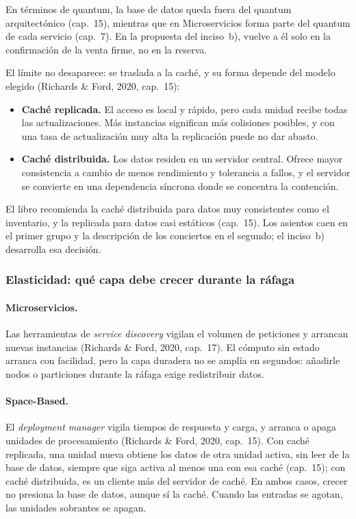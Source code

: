 En términos de quantum, la base de datos queda fuera del quantum arquitectónico
(cap.~15), mientras que en Microservicios forma parte del quantum de cada servicio
(cap.~7). En la propuesta del inciso~b), vuelve a él solo en la confirmación de la
venta firme, no en la reserva.

El límite no desaparece: se traslada a la caché, y su forma depende del modelo
elegido (Richards \& Ford, 2020, cap.~15):

\begin{itemize}
  \item \textbf{Caché replicada.} El acceso es local y rápido, pero cada unidad
    recibe todas las actualizaciones. Más instancias significan más colisiones
    posibles, y con una tasa de actualización muy alta la replicación puede no dar
    abasto.
  \item \textbf{Caché distribuida.} Los datos residen en un servidor central. Ofrece
    mayor consistencia a cambio de menos rendimiento y tolerancia a fallos, y el
    servidor se convierte en una dependencia síncrona donde se concentra la
    contención.
\end{itemize}

El libro recomienda la caché distribuida para datos muy consistentes como el
inventario, y la replicada para datos casi estáticos (cap.~15). Los asientos caen en
el primer grupo y la descripción de los conciertos en el segundo; el inciso~b)
desarrolla esa decisión.

\subsubsection{Elasticidad: qué capa debe crecer durante la ráfaga}

\paragraph{Microservicios.}
Las herramientas de \emph{service discovery} vigilan el volumen de peticiones y
arrancan nuevas instancias (Richards \& Ford, 2020, cap.~17). El cómputo sin estado
arranca con facilidad, pero la capa duradera no se amplía en segundos: añadirle nodos
o particiones durante la ráfaga exige redistribuir datos.

\paragraph{Space-Based.}
El \emph{deployment manager} vigila tiempos de respuesta y carga, y arranca o apaga
unidades de procesamiento (Richards \& Ford, 2020, cap.~15). Con caché replicada, una
unidad nueva obtiene los datos de otra unidad activa, sin leer de la base de datos,
siempre que siga activa al menos una con esa caché (cap.~15); con caché distribuida,
es un cliente más del servidor de caché. En ambos casos, crecer no presiona la base
de datos, aunque sí la caché. Cuando las entradas se agotan, las unidades sobrantes
se apagan.

